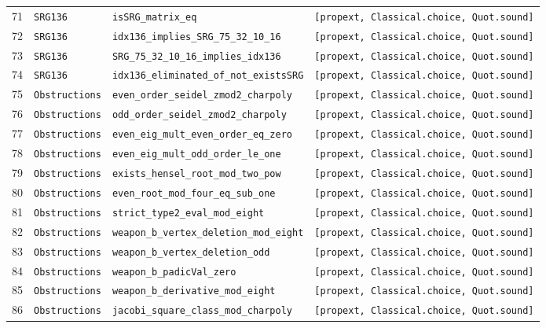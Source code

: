 \documentclass[11pt,reqno]{amsart}
\theoremstyle{definition}
\theoremstyle{remark}
\numberwithin{equation}{section}
\numberwithin{table}{section}
\begin{document}
{\begin{longtable}{@{}r>{\raggedright\arraybackslash}p{1.2in}>{\raggedright\arraybackslash}p{2.55in}>{\raggedright\arraybackslash}p{1.85in}@{}}
71 & \nolinkurl{SRG136} & \nolinkurl{isSRG_matrix_eq} & \texttt{[propext, Classical.choice, Quot.sound]} \\
72 & \nolinkurl{SRG136} & \nolinkurl{idx136_implies_SRG_75_32_10_16} & \texttt{[propext, Classical.choice, Quot.sound]} \\
73 & \nolinkurl{SRG136} & \nolinkurl{SRG_75_32_10_16_implies_idx136} & \texttt{[propext, Classical.choice, Quot.sound]} \\
74 & \nolinkurl{SRG136} & \nolinkurl{idx136_eliminated_of_not_existsSRG} & \texttt{[propext, Classical.choice, Quot.sound]} \\
75 & \nolinkurl{Obstructions} & \nolinkurl{even_order_seidel_zmod2_charpoly} & \texttt{[propext, Classical.choice, Quot.sound]} \\
76 & \nolinkurl{Obstructions} & \nolinkurl{odd_order_seidel_zmod2_charpoly} & \texttt{[propext, Classical.choice, Quot.sound]} \\
77 & \nolinkurl{Obstructions} & \nolinkurl{even_eig_mult_even_order_eq_zero} & \texttt{[propext, Classical.choice, Quot.sound]} \\
78 & \nolinkurl{Obstructions} & \nolinkurl{even_eig_mult_odd_order_le_one} & \texttt{[propext, Classical.choice, Quot.sound]} \\
79 & \nolinkurl{Obstructions} & \nolinkurl{exists_hensel_root_mod_two_pow} & \texttt{[propext, Classical.choice, Quot.sound]} \\
80 & \nolinkurl{Obstructions} & \nolinkurl{even_root_mod_four_eq_sub_one} & \texttt{[propext, Classical.choice, Quot.sound]} \\
81 & \nolinkurl{Obstructions} & \nolinkurl{strict_type2_eval_mod_eight} & \texttt{[propext, Classical.choice, Quot.sound]} \\
82 & \nolinkurl{Obstructions} & \nolinkurl{weapon_b_vertex_deletion_mod_eight} & \texttt{[propext, Classical.choice, Quot.sound]} \\
83 & \nolinkurl{Obstructions} & \nolinkurl{weapon_b_vertex_deletion_odd} & \texttt{[propext, Classical.choice, Quot.sound]} \\
84 & \nolinkurl{Obstructions} & \nolinkurl{weapon_b_padicVal_zero} & \texttt{[propext, Classical.choice, Quot.sound]} \\
85 & \nolinkurl{Obstructions} & \nolinkurl{weapon_b_derivative_mod_eight} & \texttt{[propext, Classical.choice, Quot.sound]} \\
86 & \nolinkurl{Obstructions} & \nolinkurl{jacobi_square_class_mod_charpoly} & \texttt{[propext, Classical.choice, Quot.sound]} \\

\end{longtable}}
\end{document}
